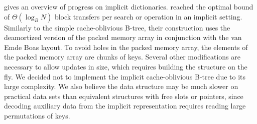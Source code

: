 \cite{implicit-btrees-survey} gives an overview of progress on implicit
dictionaries.  \cite{implicit-cob} reached the optimal bound of
$\Theta(\log_B N)$ block transfers per search or operation in an implicit
setting. Similarly to the simple cache-oblivious B-tree, their construction
uses the deamortized version of the packed memory array in conjunction with
the van Emde Boas layout. To avoid holes in the packed memory array,
the elements of the packed memory array are chunks of keys.
Several other modifications are necessary to allow updates in size, which
requires building the structure on the fly.
We decided not to implement the implicit cache-oblivious B-tree due
to its large complexity. We also believe the data structure may be much
slower on practical data sets than equivalent structures with free slots or
pointers, since decoding auxiliary data from the implicit representation
requires reading large permutations of keys.
